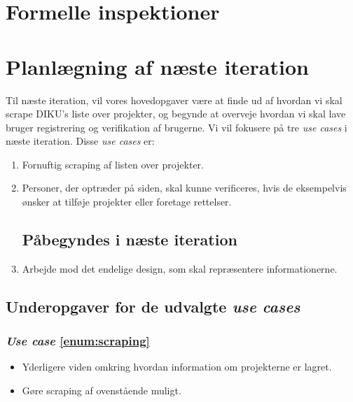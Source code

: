 \documentclass[11pt]{article}
\begin{document}
\section{Formelle inspektioner}

\section{Planlægning af næste iteration}
Til næste iteration, vil vores hovedopgaver være at finde ud af hvordan vi skal scrape DIKU's liste over projekter, og begynde at overveje hvordan vi skal lave bruger registrering og verifikation af brugerne.
Vi vil fokusere på tre \textit{use cases} i næste iteration. Disse \textit{use cases} er:
\begin{enumerate}
\subsection*{Forventes implementeret i næste iteration}
	\item \label{enum:scraping} Fornuftig scraping af listen over projekter.

	\item \label{enum:verifikation} Personer, der optræder på siden, skal kunne verificeres, hvis de eksempelvis ønsker at tilføje projekter eller foretage rettelser.

\subsection*{Påbegyndes i næste iteration}

	\item \label{enum:design} Arbejde mod det endelige design, som skal repræsentere informationerne.
\end{enumerate}

\subsection{Underopgaver for de udvalgte \textit{use cases}}
\subsubsection*{\textit{Use case} \ref{enum:scraping}}
\begin{itemize}
	\item Yderligere viden omkring hvordan information om projekterne er lagret.
	\item Gøre scraping af ovenstående muligt.
\end{itemize}
\end{document}
